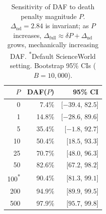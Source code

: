 \begin{table}[t]
\centering
\scriptsize
\setlength{\tabcolsep}{4pt}
\begin{tabular}{@{}rrr@{}}
\toprule
$P$ & DAF($P$) & 95\% CI \\
\midrule
0 & 7.4\% & [$-39.4$, $82.5$] \\
1 & 14.8\% & [$-28.6$, $89.6$] \\
5 & 35.4\% & [$-1.8$, $92.7$] \\
10 & 50.4\% & [$18.5$, $93.3$] \\
25 & 70.7\% & [$48.0$, $96.3$] \\
50 & 82.6\% & [$67.2$, $98.2$] \\
100\textsuperscript{*} & 90.4\% & [$81.3$, $99.1$] \\
200 & 94.9\% & [$89.9$, $99.5$] \\
500 & 97.9\% & [$95.7$, $99.8$] \\
\bottomrule
\end{tabular}
\caption{Sensitivity of DAF to death penalty magnitude $P$. $\Delta_{\text{nd}} = 2.84$ is invariant; as $P$ increases, $\Delta_{\text{full}} \approx \delta P + \Delta_{\text{nd}}$ grows, mechanically increasing DAF. \textsuperscript{*}Default ScienceWorld setting. Bootstrap 95\% CIs ($B{=}10{,}000$).}
\label{tab:penalty-sensitivity}
\end{table}
